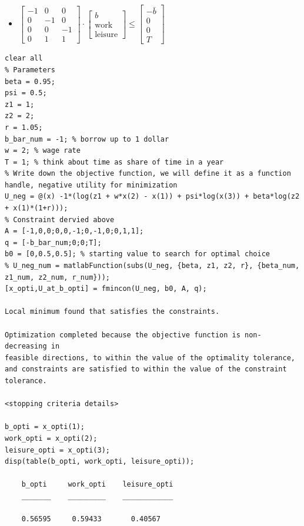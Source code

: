 \documentclass[
]{book}
\providecommand{\tightlist}{%
  \setlength{\itemsep}{0pt}\setlength{\parskip}{0pt}}
\begin{document}
\begin{itemize}
\tightlist
\item
  \(\displaystyle \left\lbrack \begin{array}{ccc} -1 & 0 & 0\\ 0 & -1 & 0\\ 0 & 0 & -1\\ 0 & 1 & 1 \end{array}\right\rbrack \cdot \left\lbrack \begin{array}{c} b\\ \textrm{work}\\ \textrm{leisure} \end{array}\right\rbrack \le \left\lbrack \begin{array}{c} -\bar{b} \\ 0\\ 0\\ T \end{array}\right\rbrack\)
\end{itemize}

\begin{verbatim}
clear all
% Parameters
beta = 0.95;
psi = 0.5;
z1 = 1;
z2 = 2;
r = 1.05;
b_bar_num = -1; % borrow up to 1 dollar 
w = 2; % wage rate
T = 1; % think about time as share of time in a year
% Write down the objective function, we will define it as a function handle, negative utility for minimization
U_neg = @(x) -1*(log(z1 + w*x(2) - x(1)) + psi*log(x(3)) + beta*log(z2 + x(1)*(1+r)));
% Constraint dervied above
A = [-1,0,0;0,0,-1;0,-1,0;0,1,1];
q = [-b_bar_num;0;0;T];
b0 = [0,0.5,0.5]; % starting value to search for optimal choice
% U_neg_num = matlabFunction(subs(U_neg, {beta, z1, z2, r}, {beta_num, z1_num, z2_num, r_num}));
[x_opti,U_at_b_opti] = fmincon(U_neg, b0, A, q);

Local minimum found that satisfies the constraints.

Optimization completed because the objective function is non-decreasing in 
feasible directions, to within the value of the optimality tolerance,
and constraints are satisfied to within the value of the constraint tolerance.

<stopping criteria details>

b_opti = x_opti(1);
work_opti = x_opti(2);
leisure_opti = x_opti(3);
disp(table(b_opti, work_opti, leisure_opti));

    b_opti     work_opti    leisure_opti
    _______    _________    ____________

    0.56595     0.59433       0.40567   
\end{verbatim}
\end{document}
